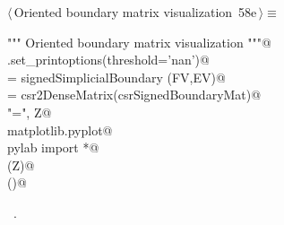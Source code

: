 \documentclass[11pt,oneside]{article}	%
\begin{document}
\begin{flushleft} \small \label{scrap111}
\protect{}$\langle\,$Oriented boundary matrix visualization\nobreak\ {\footnotesize 58e}$\,\rangle\equiv$
\vspace{-1ex}
\begin{list}{}{} \item
\mbox{}\verb@""" Oriented boundary matrix visualization """@\\
\mbox{}\verb@np.set_printoptions(threshold='nan')@\\
\mbox{}\verb@csrSignedBoundaryMat = signedSimplicialBoundary (FV,EV)@\\
\mbox{}\verb@Z = csr2DenseMatrix(csrSignedBoundaryMat)@\\
\mbox{}\verb@print "\ncsrSignedBoundaryMat =\n", Z@\\
\mbox{}\verb@import matplotlib.pyplot@\\
\mbox{}\verb@from pylab import *@\\
\mbox{}\verb@matshow(Z)@\\
\mbox{}\verb@show()@\\
\mbox{}\verb@@{\NWsep}
\end{list}
\vspace{-1ex}
\footnotesize\addtolength{\baselineskip}{-1ex}
\begin{list}{}{\setlength{\itemsep}{-\parsep}\setlength{\itemindent}{-\leftmargin}}
\item \NWtxtMacroRefIn\ .
\end{list}
\end{flushleft}
\end{document}
